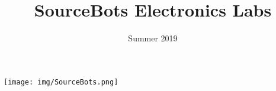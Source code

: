 \documentclass[a4paper,10pt]{article}
\title{{\titlefont SourceBots Electronics Labs}}
\date{Summer 2019}
\begin{document}
  \begin{titlepage}
    \maketitle
    \begin{center}
      \texttt{[image: img/SourceBots.png]}      
    \end{center}
  \end{titlepage}
  
  
  
  
  
  
  
  
\end{document}
